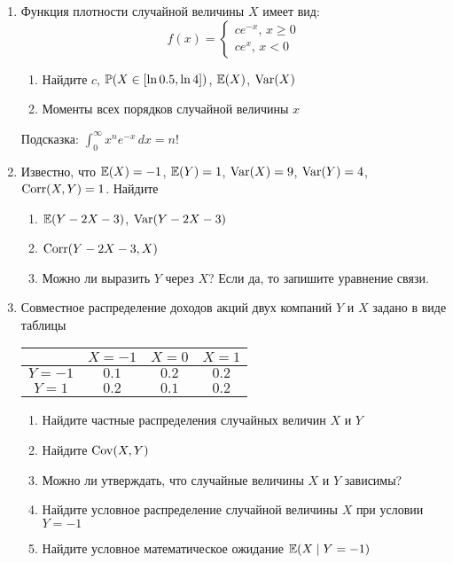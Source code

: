 \begin{enumerate}
\item Функция плотности случайной величины $X$ имеет вид:
\begin{equation}
f(x)=\begin{cases}
ce^{-x}, \, x\geq 0 \\
ce^x, \, x<0
\end{cases}
\end{equation}
\begin{enumerate}
\item Найдите $c$, $\P(X \in [\ln 0.5,\ln 4])$, $\E(X)$, $\Var(X)$
\item Моменты всех порядков случайной величины $x$
\end{enumerate}

Подсказка: $\int_0^{\infty} x^n e^{-x} \, dx=n!$

\item Известно, что  $\E(X)=-1$, $\E(Y)=1$, $\Var(X)=9$, $\Var(Y)=4$, $\Corr(X,Y)=1$. Найдите
\begin{enumerate}
\item $\E(Y-2X-3)$, $\Var(Y-2X-3)$
\item  $\Corr(Y-2X-3,X)$
\item Можно ли выразить $Y$ через $X$? Если да, то запишите уравнение связи.
\end{enumerate}

\item Совместное распределение доходов акций двух компаний $Y$ и $X$ задано в виде таблицы

\begin{tabular}{c|ccc}
 & $X=-1$ & $X=0$ & $X=1$ \\
\hline
$Y=-1$ & $0.1$ & $0.2$ & $0.2$ \\
$Y=1$ & $0.2$ & $0.1$ & $0.2$ \\
\end{tabular}


\begin{enumerate}
\item Найдите  частные распределения случайных величин $X$ и $Y$
\item Найдите $\Cov(X,Y)$
\item Можно ли утверждать, что случайные величины $X$ и $Y$ зависимы?
\item Найдите условное распределение случайной величины $X$ при условии $Y=-1$
\item Найдите условное математическое ожидание $\E(X\mid Y=-1)$
\end{enumerate}


\end{enumerate}

